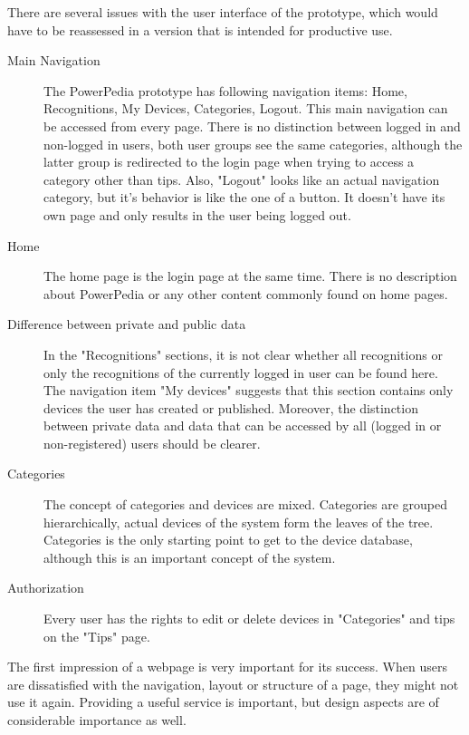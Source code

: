 There are several issues with the user interface of the prototype, which would have to be reassessed in a version that is intended for productive use.
\begin{description}
 \item[Main Navigation] The PowerPedia prototype has following navigation items: Home, Recognitions, My Devices, Categories, Logout. This main navigation can be accessed from every page. There is no distinction between logged in and non-logged in users, both user groups see the same categories, although the latter group is redirected to the login page when trying to access a category other than tips. Also, "Logout" looks like an actual navigation category, but it's behavior is like the one of a button. It doesn't have its own page and only results in the user being logged out.
 \item[Home] The home page is the login page at the same time. There is no description about PowerPedia or any other content commonly found on home pages.
 \item[Difference between private and public data] In the "Recognitions" sections, it is not clear whether all recognitions or only the recognitions of the currently logged in user can be found here. The navigation item "My devices" suggests that this section contains only devices the user has created or published. Moreover, the distinction between private data and data that can be accessed by all (logged in or non-registered) users should be clearer. 
 \item[Categories] The concept of categories and devices are mixed. Categories are grouped hierarchically, actual devices of the system form the leaves of the tree. Categories is the only starting point to get to the device database, although this is an important concept of the system.
 \item[Authorization] Every user has the rights to edit or delete devices in "Categories" and tips on the "Tips" page.
\end{description}
The first impression of a webpage is very important for its success. When users are dissatisfied with the navigation, layout or structure of a page, they might not use it again. Providing a useful service is important, but design aspects are of considerable importance as well.	







